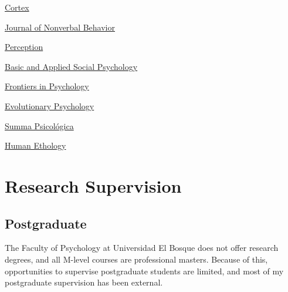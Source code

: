 \documentclass[11pt,a4paper,]{awesome-cv}
\begin{document}
\begin{cventries}
{\begin{cvitems}
\item \href{https://www.sciencedirect.com/journal/cortex}{Cortex}
\item \href{https://www.springer.com/journal/10919/}{Journal of Nonverbal Behavior}
\item \href{https://journals.sagepub.com/home/pec}{Perception}
\item \href{https://www.tandfonline.com/journals/hbas20}{Basic and Applied Social Psychology}
\item \href{https://www.frontiersin.org/journals/psychology}{Frontiers in Psychology}
\item \href{https://journals.sagepub.com/home/evp}{Evolutionary Psychology}
\item \href{http://sumapsicologica.konradlorenz.edu.co/}{Summa Psicológica}
\item \href{https://ishe.org/human-ethology/}{Human Ethology}
\end{cvitems}}
\end{cventries}

\hypertarget{research-supervision}{%
\section{Research Supervision}\label{research-supervision}}

\hypertarget{section-3}{%
\subsection{\texorpdfstring{\textbf{Postgraduate}}{}}\label{section-3}}

The Faculty of Psychology at Universidad El Bosque does not offer
research degrees, and all M-level courses are professional masters.
Because of this, opportunities to supervise postgraduate students are
limited, and most of my postgraduate supervision has been external.
\end{document}
